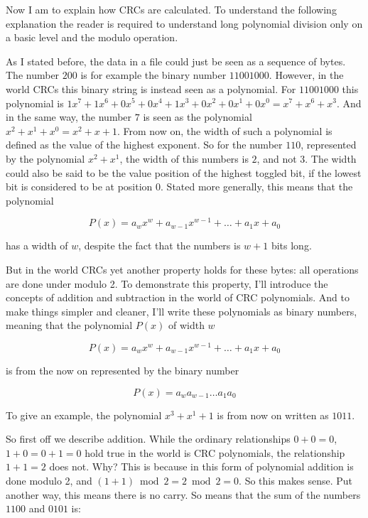 Now I am to explain how CRCs are calculated. To understand the
following explanation the reader is required to understand long
polynomial division only on a basic level and the modulo operation.

As I stated before, the data in a file could just be seen as a
sequence of bytes. The number $200$ is for example the binary number
$1100 1000$. However, in the world CRCs this binary string is instead
seen as a polynomial. For $1100 1000$ this polynomial is $1x^7 + 1x^6
+ 0x^5 + 0x^4 + 1x^3 + 0x^2 + 0x^1 + 0x^0 = x^7 + x^6 + x^3$. And in
the same way, the number $7$ is seen as the polynomial $x^2 + x^1 +
x^0 = x^2 + x + 1$. From now on, the width of such a polynomial is
defined as the value of the highest exponent. So for the number $110$,
represented by the polynomial $x^2 + x^1$, the width of this numbers
is $2$, and not $3$. The width could also be said to be the value
position of the highest toggled bit, if the lowest bit is considered
to be at position $0$. Stated more generally, this means that the
polynomial

\begin{equation*}
  P(x) = a_wx^w + a_{w-1}x^{w-1} + \dots + a_{1}x + a_{0}
\end{equation*}

has a width of $w$, despite the fact that the numbers is $w + 1$ bits
long.

But in the world CRCs yet another property holds for these bytes: all
operations are done under modulo 2. To demonstrate this property, I'll
introduce the concepts of addition and subtraction in the world of CRC
polynomials. And to make things simpler and cleaner, I'll write these
polynomials as binary numbers, meaning that the polynomial $P(x)$ of
width $w$

\begin{equation*}
  P(x) = a_wx^w + a_{w-1}x^{w-1} + \dots + a_{1}x + a_{0}
\end{equation*}

is from the now on represented by the binary number

\begin{equation*}
  P(x) = a_wa_{w-1} \dots a_{1} a_{0}
\end{equation*}

To give an example, the polynomial $x^3 + x^1 + 1$ is from now on written as
$1011$.

So first off we describe addition. While the ordinary relationships $0 + 0 =
0$, $1 + 0 = 0 + 1 = 0$ hold true in the world is CRC polynomials, the
relationship $1 + 1 = 2$ does not. Why? This is because in this form
of polynomial addition is done modulo 2, and $(1 + 1) \bmod 2 = 2
\bmod 2 = 0$. So this makes sense. Put another way, this means there
is no carry. So means that the sum of the numbers $1100$ and $0101$
is:

